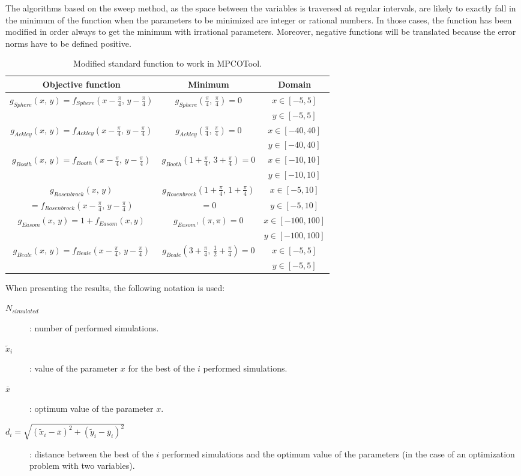 \documentclass[review,authoryear]{elsarticle}
\newcommand{\TABLE}[5]
{
	\begin{table}[ht!]
		\centering
		\caption{#4.\label{#5}}
		#1
		\begin{tabular}{#2}
			#3
		\end{tabular}
	\end{table}
}
\newcommand{\PA}[1]{\left(#1\right)}
\begin{document}
The algorithms based on the sweep method, as the space between the variables
is traversed at regular intervals, are likely to exactly fall in the minimum
of the function when the parameters to be minimized are integer or rational
numbers. In those cases, the function has been modified in order always to get 
the minimum with irrational parameters. Moreover, negative functions will be
translated because the error norms have to be defined positive.
\TABLE{\scriptsize}{ccc}
{
	Objective function & Minimum & Domain \\
	\hline
	\multirow{2}{*}{$g_{Sphere}(x,\,y)
		=f_{Sphere}\PA{x-\frac{\pi}{4},\,y-\frac{\pi}{4}}$} &
		\multirow{2}{*}{$g_{Sphere}\PA{\frac{\pi}{4},\,\frac{\pi}{4}}=0$} &
	$x\in[-5,5]$ \\ & & $y\in[-5,5]$ \\
	\multirow{2}{*}{$g_{Ackley}(x,\,y)
		=f_{Ackley}\PA{x-\frac{\pi}{4},\,y-\frac{\pi}{4}}$} &
	\multirow{2}{*}{$g_{Ackley}\PA{\frac{\pi}{4},\,\frac{\pi}{4}}=0$} &
	$x\in[-40,40]$ \\ & & $y\in[-40,40]$ \\
	\multirow{2}{*}{$g_{Booth}(x,\,y)
		=f_{Booth}\PA{x-\frac{\pi}{4},\,y-\frac{\pi}{4}}$} &
	\multirow{2}{*}{$g_{Booth}\PA{1+\frac{\pi}{4},\,3+\frac{\pi}{4}}=0$} &
	$x\in[-10,10]$ \\ & & $y\in[-10,10]$ \\
	$g_{Rosenbrock}(x,\,y)$ &
	$g_{Rosenbrock}\PA{1+\frac{\pi}{4},\,1+\frac{\pi}{4}}$ &
	$x\in[-5,10]$ \\ 
	$=f_{Rosenbrock}\PA{x-\frac{\pi}{4},\,y-\frac{\pi}{4}}$ &
	$=0$ &
	$y\in[-5,10]$ \\
	\multirow{2}{*}{$g_{Easom}(x,\,y)=1+f_{Easom}(x,y)$} &
	\multirow{2}{*}{$g_{Easom},(\pi,\pi)=0$} &
	$x\in[-100,100]$ \\ & & $y\in[-100,100]$ \\
	\multirow{2}{*}{$g_{Beale}(x,\,y)
		=f_{Beale}\PA{x-\frac{\pi}{4},\,y-\frac{\pi}{4}}$} &
	\multirow{2}{*}{$g_{Beale}\PA{3+\frac{\pi}{4},\,\frac12+\frac{\pi}{4}}=0$} &
	$x\in[-5,5]$ \\ & & $y\in[-5,5]$
}{Modified standard function to work in MPCOTool}{TabModifiedTests}

When presenting the results, the following notation is used:
\begin{description}
\item[$N_{simulated}$]: number of performed simulations. 
\item[$\tilde{x}_i$]: value of the parameter $x$ for the best of the $i$
	performed simulations.
\item[$\overline{x}$]: optimum value of the parameter $x$.
\item[$d_i=\sqrt{\PA{\tilde{x}_i-\overline{x}}^2
	+\PA{\tilde{y}_i-\overline{y}_i}^2}$]: distance between the best of the $i$
	performed simulations and the optimum value of the parameters (in the case
    of an optimization problem with two variables).
\end{description}
\end{document}
